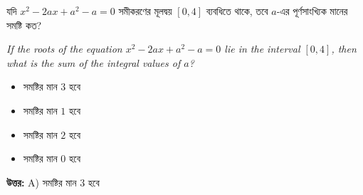 \documentclass[12pt, a4paper]{article}
\begin{document}
\vspace{1.5em}

\begin{tcolorbox}[questionbox={প্রশ্ন (Question) 30}]
    \noindent
    যদি $x^2 - 2ax + a^2 - a = 0$ সমীকরণের মূলদ্বয় $[0, 4]$ ব্যবধিতে থাকে, তবে $a$-এর পূর্ণসাংখ্যিক মানের সমষ্টি কত?
    
    \vspace{0.8em}
    \begin{english}
    \noindent\textit{\color{darkgray}
    If the roots of the equation $x^2 - 2ax + a^2 - a = 0$ lie in the interval $[0, 4]$, then what is the sum of the integral values of $a$?
    }
    \end{english}
\end{tcolorbox}

\begin{itemize}[label={}, leftmargin=1cm, itemsep=0.5em]
    \item[\textbf{A)}] সমষ্টির মান $3$ হবে
    \item[\textbf{B)}] সমষ্টির মান $1$ হবে
    \item[\textbf{C)}] সমষ্টির মান $2$ হবে
    \item[\textbf{D)}] সমষ্টির মান $0$ হবে
\end{itemize}

\vspace{0.5em}
\begin{tcolorbox}[answerbox]
    \textbf{\color{success} উত্তর:} A) সমষ্টির মান $3$ হবে
\end{tcolorbox}
\vspace{1em}
\end{document}
